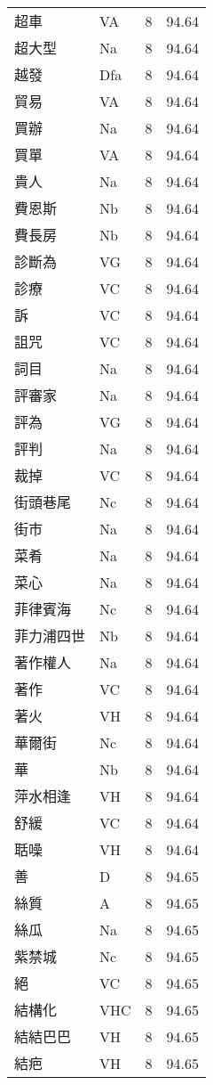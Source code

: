 \documentclass[twocolumn]{book}
\begin{document}
\begin{supertabular}{llrr}
超車 & VA & 8 &  94.64\\
超大型 & Na & 8 &  94.64\\
越發 & Dfa & 8 &  94.64\\
貿易 & VA & 8 &  94.64\\
買辦 & Na & 8 &  94.64\\
買單 & VA & 8 &  94.64\\
貴人 & Na & 8 &  94.64\\
費恩斯 & Nb & 8 &  94.64\\
費長房 & Nb & 8 &  94.64\\
診斷為 & VG & 8 &  94.64\\
診療 & VC & 8 &  94.64\\
訴 & VC & 8 &  94.64\\
詛咒 & VC & 8 &  94.64\\
詞目 & Na & 8 &  94.64\\
評審家 & Na & 8 &  94.64\\
評為 & VG & 8 &  94.64\\
評判 & Na & 8 &  94.64\\
裁掉 & VC & 8 &  94.64\\
街頭巷尾 & Nc & 8 &  94.64\\
街市 & Na & 8 &  94.64\\
菜肴 & Na & 8 &  94.64\\
菜心 & Na & 8 &  94.64\\
菲律賓海 & Nc & 8 &  94.64\\
菲力浦四世 & Nb & 8 &  94.64\\
著作權人 & Na & 8 &  94.64\\
著作 & VC & 8 &  94.64\\
著火 & VH & 8 &  94.64\\
華爾街 & Nc & 8 &  94.64\\
華 & Nb & 8 &  94.64\\
萍水相逢 & VH & 8 &  94.64\\
舒緩 & VC & 8 &  94.64\\
聒噪 & VH & 8 &  94.64\\
善 & D & 8 &  94.65\\
絲質 & A & 8 &  94.65\\
絲瓜 & Na & 8 &  94.65\\
紫禁城 & Nc & 8 &  94.65\\
絕 & VC & 8 &  94.65\\
結構化 & VHC & 8 &  94.65\\
結結巴巴 & VH & 8 &  94.65\\
結疤 & VH & 8 &  94.65\\

\end{supertabular}
\end{document}
